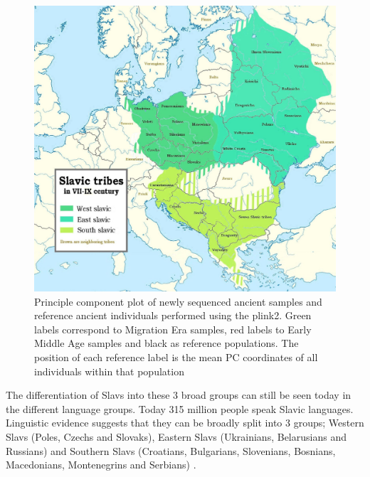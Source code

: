 \begin{figure}[htp]
    \centering
    \includegraphics[width=1.0\textwidth]{../images/chapter5/Slavic_tribes_in_the_7th_to_9th_century.jpg}
    \caption{Principle component plot of newly sequenced ancient samples and reference ancient individuals performed using the plink2. Green labels correspond to Migration Era samples, red labels to Early Middle Age samples and black as reference populations. The position of each reference label is the mean PC coordinates of all individuals within that population}
    \label{fig:Slavic_tribes}
\end{figure}

The differentiation of Slavs into these 3 broad groups can still be seen today in the different language groups. Today 315 million people speak Slavic languages. Linguistic evidence suggests that they can be broadly split into 3 groups; Western Slavs (Poles, Czechs and Slovaks), Eastern Slavs (Ukrainians, Belarusians and Russians) and Southern Slavs (Croatians, Bulgarians, Slovenians, Bosnians, Macedonians, Montenegrins and Serbians) \cite{sussex2006slavic}. 

